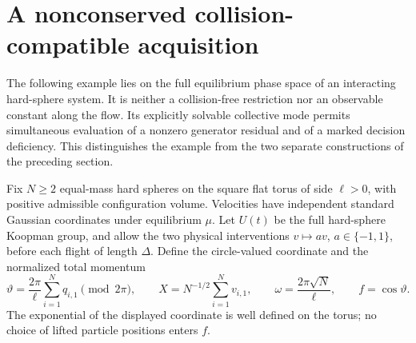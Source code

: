 \section{A nonconserved collision-compatible acquisition}
\label{sec:v16-physical}
The following example lies on the full equilibrium phase space of an
interacting hard-sphere system. It is neither a collision-free restriction
nor an observable constant along the flow. Its explicitly solvable
collective mode permits simultaneous evaluation of a nonzero generator
residual and of a marked decision deficiency. This distinguishes the
example from the two separate constructions of the preceding section.

Fix $N\ge2$ equal-mass hard spheres on the square flat torus of side
$\ell>0$, with positive admissible configuration volume. Velocities
have independent standard Gaussian coordinates under equilibrium $\mu$.
Let $U(t)$ be the full hard-sphere Koopman group, and allow the two
physical interventions $v\mapsto av$, $a\in\{-1,1\}$, before each
flight of length $\Delta$. Define the circle-valued coordinate and the
normalized total momentum
\[
 \vartheta=\frac{2\pi}{\ell}\sum_{i=1}^N q_{i,1}\pmod {2\pi},\qquad
 X=N^{-1/2}\sum_{i=1}^N v_{i,1},\qquad
 \omega=\frac{2\pi\sqrt N}{\ell},\qquad f=\cos\vartheta.
\]
The exponential of the displayed coordinate is well defined on the torus;
no choice of lifted particle positions enters $f$.

